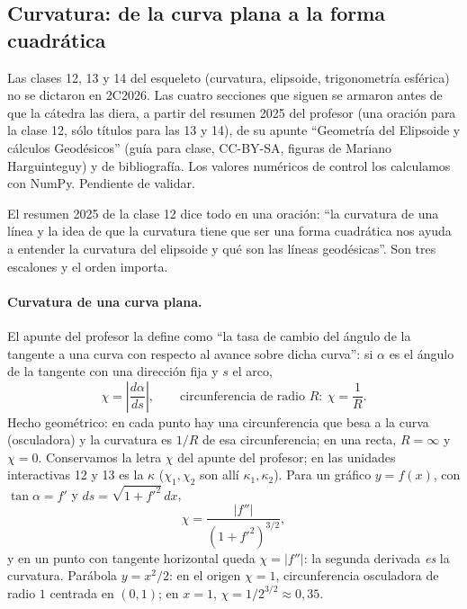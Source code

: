 \subsection{Curvatura: de la curva plana a la forma cuadrática}\label{sec:curvatura}

{\small\vspace{1mm}\par}
{\small\vspace{1mm}\par}


\begin{atencion}[Anticipado]
Las clases 12, 13 y 14 del esqueleto (curvatura, elipsoide, trigonometría esférica) no se
dictaron en 2C2026. Las cuatro secciones que siguen se armaron antes de que la cátedra las
diera, a partir del resumen 2025 del profesor (una oración para la clase 12, sólo títulos
para las 13 y 14), de su apunte ``Geometría del Elipsoide y cálculos Geodésicos'' (guía
para clase, CC-BY-SA, figuras de Mariano Harguinteguy) y de bibliografía. Los valores
numéricos de control los calculamos con NumPy. Pendiente de validar.
\end{atencion}

El resumen 2025 de la clase 12 dice todo en una oración: ``la curvatura de una línea y la
idea de que la curvatura tiene que ser una forma cuadrática nos ayuda a entender la
curvatura del elipsoide y qué son las líneas geodésicas''. Son tres escalones y el orden
importa.

\paragraph{Curvatura de una curva plana.} El apunte del profesor la define como ``la tasa
de cambio del ángulo de la tangente a una curva con respecto al avance sobre dicha
curva'': si \(\alpha\) es el ángulo de la tangente con una dirección fija y \(s\) el arco,
\[
  \chi=\left|\frac{d\alpha}{ds}\right|,\qquad \text{circunferencia de radio } R:\ \chi=\frac1R .
\]
Hecho geométrico: en cada punto hay una circunferencia que besa a la curva (osculadora) y
la curvatura es \(1/R\) de esa circunferencia; en una recta, \(R=\infty\) y \(\chi=0\). Conservamos la letra
\(\chi\) del apunte del profesor; en las unidades interactivas 12 y 13 es la \(\kappa\)
(\(\chi_1,\chi_2\) son allí \(\kappa_1,\kappa_2\)).
Para un gráfico \(y=f(x)\), con \(\tan\alpha=f'\) y \(ds=\sqrt{1+f'^2}\,dx\),
\[
  \chi=\frac{|f''|}{(1+f'^2)^{3/2}} ,
\]
y en un punto con tangente horizontal queda \(\chi=|f''|\): la segunda derivada \emph{es}
la curvatura. Parábola \(y=x^2/2\): en el origen \(\chi=1\), circunferencia osculadora de
radio \(1\) centrada en \((0,1)\); en \(x=1\), \(\chi=1/2^{3/2}\approx0{,}35\).

